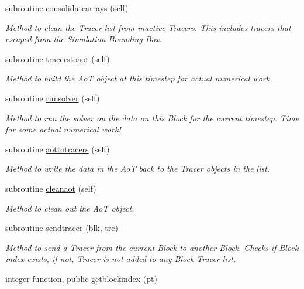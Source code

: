 \begin{DoxyCompactItemize}
subroutine \mbox{\hyperlink{namespaceblocks__mod_a25ff530b5125e4cee5b1f474b2491883}{consolidatearrays}} (self)
\begin{DoxyCompactList}\small\item\em Method to clean the Tracer list from inactive Tracers. This includes tracers that escaped from the Simulation Bounding Box. \end{DoxyCompactList}\item 
subroutine \mbox{\hyperlink{namespaceblocks__mod_ae7afa742f8f89a6a8afdefb7f8c87efd}{tracerstoaot}} (self)
\begin{DoxyCompactList}\small\item\em Method to build the AoT object at this timestep for actual numerical work. \end{DoxyCompactList}\item 
subroutine \mbox{\hyperlink{namespaceblocks__mod_a3245bdadbec6bb123c517921d1503b48}{runsolver}} (self)
\begin{DoxyCompactList}\small\item\em Method to run the solver on the data on this Block for the current timestep. Time for some actual numerical work! \end{DoxyCompactList}\item 
subroutine \mbox{\hyperlink{namespaceblocks__mod_a27c7e788c5f3979bfe9d43aad138286a}{aottotracers}} (self)
\begin{DoxyCompactList}\small\item\em Method to write the data in the AoT back to the Tracer objects in the list. \end{DoxyCompactList}\item 
subroutine \mbox{\hyperlink{namespaceblocks__mod_a6cc313e046daa2720cbca810d083faa0}{cleanaot}} (self)
\begin{DoxyCompactList}\small\item\em Method to clean out the AoT object. \end{DoxyCompactList}\item 
subroutine \mbox{\hyperlink{namespaceblocks__mod_a5a9992de40470e417ec8e40e688f6a0e}{sendtracer}} (blk, trc)
\begin{DoxyCompactList}\small\item\em Method to send a Tracer from the current Block to another Block. Checks if Block index exists, if not, Tracer is not added to any Block Tracer list. \end{DoxyCompactList}\item 
integer function, public \mbox{\hyperlink{namespaceblocks__mod_a62e8fb0d6b2535b4499c7a4d848c24ba}{getblockindex}} (pt)

\end{DoxyCompactItemize}
